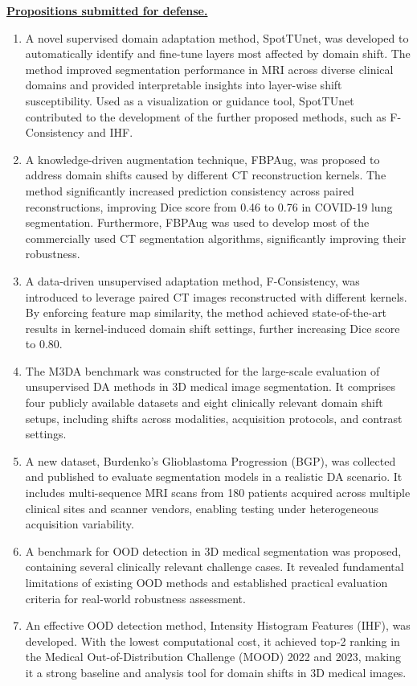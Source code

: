 \underline{\textbf{Propositions submitted for defense.}}

\begin{enumerate}
	\item A novel supervised domain adaptation method, SpotTUnet, was developed to automatically identify and fine-tune layers most affected by domain shift. The method improved segmentation performance in MRI across diverse clinical domains and provided interpretable insights into layer-wise shift susceptibility. Used as a visualization or guidance tool, SpotTUnet contributed to the development of the further proposed methods, such as F-Consistency and IHF.
	\item A knowledge-driven augmentation technique, FBPAug, was proposed to address domain shifts caused by different CT reconstruction kernels. The method significantly increased prediction consistency across paired reconstructions, improving Dice score from 0.46 to 0.76 in COVID-19 lung segmentation. Furthermore, FBPAug was used to develop most of the commercially used CT segmentation algorithms, significantly improving their robustness.
	\item A data-driven unsupervised adaptation method, F-Consistency, was introduced to leverage paired CT images reconstructed with different kernels. By enforcing feature map similarity, the method achieved state-of-the-art results in kernel-induced domain shift settings, further increasing Dice score to 0.80.
	\item The M3DA benchmark was constructed for the large-scale evaluation of unsupervised DA methods in 3D medical image segmentation. It comprises four publicly available datasets and eight clinically relevant domain shift setups, including shifts across modalities, acquisition protocols, and contrast settings.
	\item A new dataset, Burdenko’s Glioblastoma Progression (BGP), was collected and published to evaluate segmentation models in a realistic DA scenario. It includes multi-sequence MRI scans from 180 patients acquired across multiple clinical sites and scanner vendors, enabling testing under heterogeneous acquisition variability.
	\item A benchmark for OOD detection in 3D medical segmentation was proposed, containing several clinically relevant challenge cases. It revealed fundamental limitations of existing OOD methods and established practical evaluation criteria for real-world robustness assessment.
	\item An effective OOD detection method, Intensity Histogram Features (IHF), was developed. With the lowest computational cost, it achieved top-2 ranking in the Medical Out-of-Distribution Challenge (MOOD) 2022 and 2023, making it a strong baseline and analysis tool for domain shifts in 3D medical images.
\end{enumerate}


